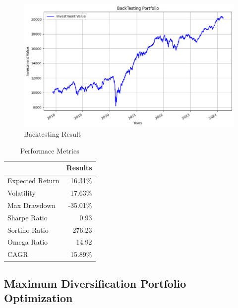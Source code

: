  \begin{figure}[H]
   \centering
   \includegraphics[width=1\linewidth]{images/equal_weight/backtest.png}
   \caption{Backtesting Result}
   \label{fig:network_architecture1}
 \end{figure}

 \begin{table}[H]

    \centering %
    \label{tab:performance_metrics}
    
    \caption{Performace Metrics}
    \vspace{5mm} %

\begin{tabular}{lr}
\toprule
 & Results \\
\midrule
Expected Return & 16.31\% \\
Volatility & 17.63\% \\
Max Drawdown & -35.01\% \\
Sharpe Ratio & 0.93 \\
Sortino Ratio & 276.23 \\
Omega Ratio & 14.92 \\
CAGR & 15.89\% \\
\bottomrule
\end{tabular}
\end{table}

\subsection{Maximum Diversification Portfolio Optimization}

